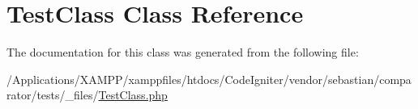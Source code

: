 \hypertarget{class_sebastian_bergmann_1_1_comparator_1_1_test_class}{}\section{Test\+Class Class Reference}
\label{class_sebastian_bergmann_1_1_comparator_1_1_test_class}


The documentation for this class was generated from the following file\+:\begin{DoxyCompactItemize}
\item 
/\+Applications/\+X\+A\+M\+P\+P/xamppfiles/htdocs/\+Code\+Igniter/vendor/sebastian/comparator/tests/\+\_\+files/\mbox{\hyperlink{_test_class_8php}{Test\+Class.\+php}}\end{DoxyCompactItemize}
